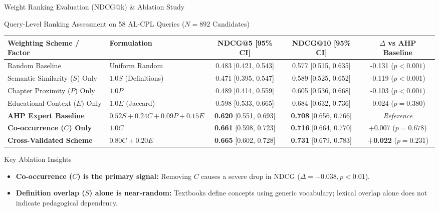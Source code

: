 \documentclass[aspectratio=169,10pt]{beamer}
\begin{document}
\begin{frame}{Weight Ranking Evaluation (NDCG@k) \& Ablation Study}
    \begin{block}{Query-Level Ranking Assessment on 58 AL-CPL Queries ($N=892$ Candidates)}
        \centering
        \small
        \begin{tabular}{llccc}
            \toprule
            \textbf{Weighting Scheme / Factor} & \textbf{Formulation} & \textbf{NDCG@5} [95\% CI] & \textbf{NDCG@10} [95\% CI] & \textbf{$\Delta$ vs AHP Baseline} \\
            \midrule
            Random Baseline & Uniform Random & 0.483 [0.421, 0.543] & 0.577 [0.515, 0.635] & -0.131 ($p < 0.001$) \\
            Semantic Similarity ($S$) Only & $1.0 S$ (Definitions) & 0.471 [0.395, 0.547] & 0.589 [0.525, 0.652] & -0.119 ($p < 0.001$) \\
            Chapter Proximity ($P$) Only & $1.0 P$ & 0.489 [0.414, 0.559] & 0.605 [0.536, 0.668] & -0.103 ($p < 0.001$) \\
            Educational Context ($E$) Only & $1.0 E$ (Jaccard) & 0.598 [0.533, 0.665] & 0.684 [0.632, 0.736] & -0.024 ($p = 0.380$) \\
            \textbf{AHP Expert Baseline} & $0.52S+0.24C+0.09P+0.15E$ & \textbf{0.620} [0.551, 0.693] & \textbf{0.708} [0.656, 0.766] & \textit{Reference} \\
            \textbf{Co-occurrence ($C$) Only} & $1.0 C$ & \textbf{0.661} [0.598, 0.723] & \textbf{0.716} [0.664, 0.770] & +0.007 ($p = 0.678$) \\
            \textbf{Cross-Validated Scheme} & \textbf{$0.80 C + 0.20 E$} & \textbf{0.665} [0.602, 0.728] & \textbf{0.731} [0.679, 0.783] & \textbf{+0.022} ($p = 0.231$) \\
            \bottomrule
        \end{tabular}
    \end{block}

    \begin{alertblock}{Key Ablation Insights}
        \footnotesize
        \begin{itemize}
            \item \textbf{Co-occurrence ($C$) is the primary signal:} Removing $C$ causes a severe drop in NDCG ($\Delta = -0.038, p < 0.01$).
            \item \textbf{Definition overlap ($S$) alone is near-random:} Textbooks define concepts using generic vocabulary; lexical overlap alone does not indicate pedagogical dependency.
        \end{itemize}
    \end{alertblock}
\end{frame}
\end{document}
